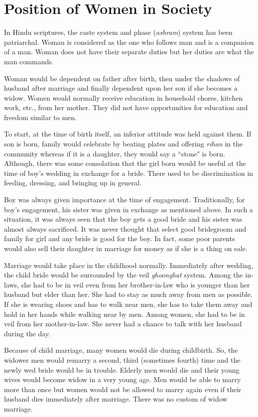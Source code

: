 \chapter{Position of Women in Society}
In Hindu scriptures, the caste system and phase (\textit{ashram}) system has
been patriarchal. Woman is considered as the one who follows man and is a
companion of a man. Woman does not have their separate duties but her duties
are what the man commands.

Woman would be dependent on father after birth, then under the shadows of
husband after marriage and finally dependent upon her son if she becomes a
widow. Women would normally receive education in household chores, kitchen
work, etc., from her mother. They did not have opportunities for education and
freedom similar to men.

To start, at the time of birth itself, an inferior attitude was held against
them. If son is born, family would celebrate by beating plates and offering
\textit{rihan} in the community whereas if it is a daughter, they would say a
``stone" is born. Although, there was some consolation that the girl born would
be useful at the time of boy's wedding in exchange for a bride. There used to
be discrimination in feeding, dressing, and bringing up in general.

Boy was always given importance at the time of engagement. Traditionally, for
boy's engagement, his sister was given in exchange as mentioned above. In such
a situation, it was always seen that the boy gets a good bride and his sister
was almost always sacrificed. It was never thought that select good bridegroom and
family for girl and any bride is good for the boy. In fact, some poor parents
would also sell their daughter in marriage for money as if she is a thing on
sale.

Marriage would take place in the childhood normally. Immediately after wedding,
the child bride would be surrounded by the veil \textit{ghoonghat} system. Among
the in-laws, she had to be in veil even from her brother-in-law who is younger
than her husband but elder than her. She had to stay as much away from men as
possible. If she is wearing shoes and has to walk near men, she has to take
them away and hold in her hands while walking near by men. Among women, she had
to be in veil from her mother-in-law. She never had a chance to talk with her
husband during the day.

Because of child marriage, many women would die during childbirth. So, the
widower men would remarry a second, third (sometimes fourth) time and the newly
wed bride would be in trouble. Elderly men would die and their young wives
would become widow in a very young age. Men would be able to marry more than
once but women would not be allowed to marry again even if their husband dies
immediately after marriage. There was no custom of widow marriage.

